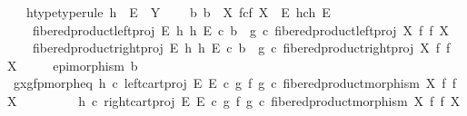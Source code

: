\begin{isabellebody}
\ \ \ h{\isacharunderscore}{\kern0pt}type{\isacharbrackleft}{\kern0pt}type{\isacharunderscore}{\kern0pt}rule{\isacharbrackright}{\kern0pt}{\isacharcolon}{\kern0pt}\ {\isachardoublequoteopen}h\ {\isacharcolon}{\kern0pt}\ E\ {\isasymrightarrow}\ Y{\isachardoublequoteclose}\isanewline
\ \ \ {\isachardoublequoteopen}{\isasymexists}{\isacharbang}{\kern0pt}\ b{\isachardot}{\kern0pt}\ b\ {\isacharcolon}{\kern0pt}\ X\ \isactrlbsub f\isactrlesub {\isasymtimes}\isactrlsub c\isactrlbsub f\isactrlesub \ X\ {\isasymrightarrow}\ E\ \isactrlbsub h\isactrlesub {\isasymtimes}\isactrlsub c\isactrlbsub h\isactrlesub \ E\ {\isasymand}\isanewline
\ \ \ \ fibered{\isacharunderscore}{\kern0pt}product{\isacharunderscore}{\kern0pt}left{\isacharunderscore}{\kern0pt}proj\ E\ h\ h\ E\ {\isasymcirc}\isactrlsub c\ b\ {\isacharequal}{\kern0pt}\ g\ {\isasymcirc}\isactrlsub c\ fibered{\isacharunderscore}{\kern0pt}product{\isacharunderscore}{\kern0pt}left{\isacharunderscore}{\kern0pt}proj\ X\ f\ f\ X\ {\isasymand}\isanewline
\ \ \ \ fibered{\isacharunderscore}{\kern0pt}product{\isacharunderscore}{\kern0pt}right{\isacharunderscore}{\kern0pt}proj\ E\ h\ h\ E\ {\isasymcirc}\isactrlsub c\ b\ {\isacharequal}{\kern0pt}\ g\ {\isasymcirc}\isactrlsub c\ fibered{\isacharunderscore}{\kern0pt}product{\isacharunderscore}{\kern0pt}right{\isacharunderscore}{\kern0pt}proj\ X\ f\ f\ X\ {\isasymand}\isanewline
\ \ \ \ epimorphism\ b{\isachardoublequoteclose}\isanewline
%
\isadelimproof
%
\endisadelimproof
%
\isatagproof
{}\isamarkupfalse%
\ {\isacharminus}{\kern0pt}\isanewline
\ \ \isamarkupfalse%
\ gxg{\isacharunderscore}{\kern0pt}fpmorph{\isacharunderscore}{\kern0pt}eq{\isacharcolon}{\kern0pt}\ {\isachardoublequoteopen}{\isacharparenleft}{\kern0pt}h\ {\isasymcirc}\isactrlsub c\ left{\isacharunderscore}{\kern0pt}cart{\isacharunderscore}{\kern0pt}proj\ E\ E{\isacharparenright}{\kern0pt}\ {\isasymcirc}\isactrlsub c\ {\isacharparenleft}{\kern0pt}g\ {\isasymtimes}\isactrlsub f\ g{\isacharparenright}{\kern0pt}\ {\isasymcirc}\isactrlsub c\ fibered{\isacharunderscore}{\kern0pt}product{\isacharunderscore}{\kern0pt}morphism\ X\ f\ f\ X\isanewline
\ \ \ \ \ \ \ \ {\isacharequal}{\kern0pt}\ {\isacharparenleft}{\kern0pt}h\ {\isasymcirc}\isactrlsub c\ right{\isacharunderscore}{\kern0pt}cart{\isacharunderscore}{\kern0pt}proj\ E\ E{\isacharparenright}{\kern0pt}\ {\isasymcirc}\isactrlsub c\ {\isacharparenleft}{\kern0pt}g\ {\isasymtimes}\isactrlsub f\ g{\isacharparenright}{\kern0pt}\ {\isasymcirc}\isactrlsub c\ fibered{\isacharunderscore}{\kern0pt}product{\isacharunderscore}{\kern0pt}morphism\ X\ f\ f\ X{\isachardoublequoteclose}\isanewline

\end{isabellebody}
